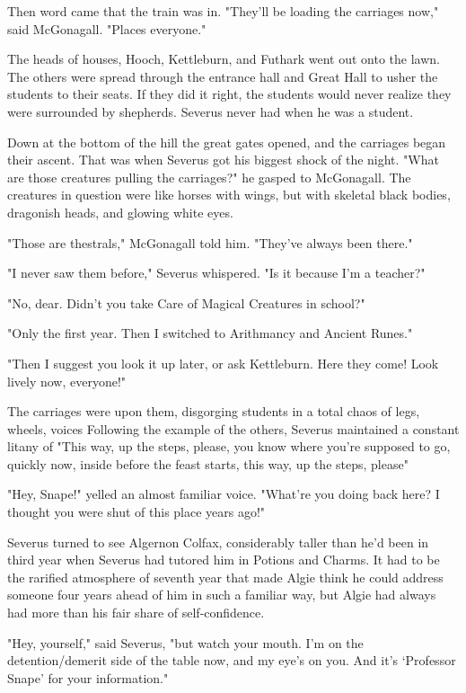 Then word came that the train was in. "They'll be loading the carriages now," said McGonagall. "Places everyone."

The heads of houses, Hooch, Kettleburn, and Futhark went out onto the lawn. The others were spread through the entrance hall and Great Hall to usher the students to their seats. If they did it right, the students would never realize they were surrounded by shepherds. Severus never had when he was a student.

Down at the bottom of the hill the great gates opened, and the carriages began their ascent. That was when Severus got his biggest shock of the night. "What are those creatures pulling the carriages?" he gasped to McGonagall. The creatures in question were like horses with wings, but with skeletal black bodies, dragonish heads, and glowing white eyes.

"Those are thestrals," McGonagall told him. "They've always been there."

"I never saw them before," Severus whispered. "Is it because I'm a teacher?"

"No, dear. Didn't you take Care of Magical Creatures in school?"

"Only the first year. Then I switched to Arithmancy and Ancient Runes."

"Then I suggest you look it up later, or ask Kettleburn. Here they come! Look lively now, everyone!"

The carriages were upon them, disgorging students in a total chaos of legs, wheels, voices{\el} Following the example of the others, Severus maintained a constant litany of "This way, up the steps, please, you know where you're supposed to go, quickly now, inside before the feast starts, this way, up the steps, please{\el}"

"Hey, Snape!" yelled an almost familiar voice. "What're you doing back here? I thought you were shut of this place years ago!"

Severus turned to see Algernon Colfax, considerably taller than he'd been in third year when Severus had tutored him in Potions and Charms. It had to be the rarified atmosphere of seventh year that made Algie think he could address someone four years ahead of him in such a familiar way, but Algie had always had more than his fair share of self-confidence.

"Hey, yourself," said Severus, "but watch your mouth. I'm on the detention\slash demerit side of the table now, and my eye's on you. And it's `Professor Snape' for your information."

